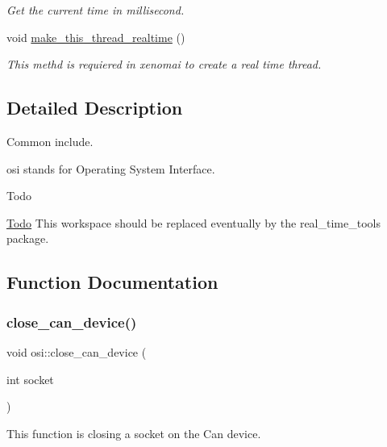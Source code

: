 \begin{DoxyCompactItemize}
\begin{DoxyCompactList}\small\item\em Get the current time in millisecond. \end{DoxyCompactList}\item 
\mbox{\label{namespaceosi_af6772d4aea95e99bc2bd0aabc557a20e}} 
void \hyperlink{namespaceosi_af6772d4aea95e99bc2bd0aabc557a20e}{make\+\_\+this\+\_\+thread\+\_\+realtime} ()
\begin{DoxyCompactList}\small\item\em This methd is requiered in xenomai to create a real time thread. \end{DoxyCompactList}\end{DoxyCompactItemize}


\subsection{Detailed Description}
Common include. 

osi stands for Operating System Interface. \begin{DoxyRefDesc}{Todo}
\item[\hyperlink{todo__todo000004}{Todo}]This workspace should be replaced eventually by the real\+\_\+time\+\_\+tools package. \end{DoxyRefDesc}


\subsection{Function Documentation}
\mbox{\label{namespaceosi_a92dc20de3b4933a10f24c98cecf2568b}} 
\subsubsection{\texorpdfstring{close\+\_\+can\+\_\+device()}{close\_can\_device()}}
{\footnotesize\ttfamily void osi\+::close\+\_\+can\+\_\+device (\begin{DoxyParamCaption}\item[{int}]{socket }\end{DoxyParamCaption})\hspace{0.3cm}{\ttfamily [inline]}}



This function is closing a socket on the Can device. 

